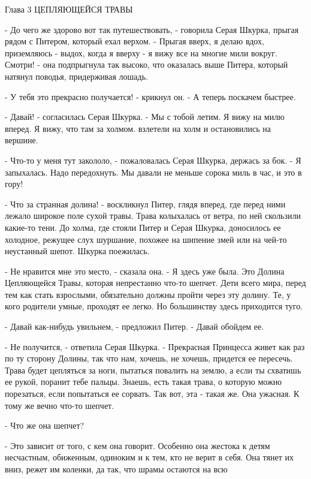 Глава 3
 ЦЕПЛЯЮЩЕЙСЯ ТРАВЫ
\par\par- До чего же здорово вот так путешествовать, - говорила Серая 
Шкурка, прыгая рядом с Питером, который ехал верхом. - Прыгая вверх, я 
делаю вдох, приземляюсь - выдох, когда я вверху - я вижу все на многие 
мили вокруг. Смотри! - она подпрыгнула так высоко, что оказалась выше 
Питера, который натянул поводья, придерживая лошадь.
\par- У тебя это прекрасно получается! - крикнул он. - А теперь 
поскачем быстрее.
\par- Давай! - согласилась Серая Шкурка. - Мы с тобой летим. Я вижу на 
милю вперед. Я вижу, что там за холмом.
 взлетели на холм и остановились на вершине.
\par- Что-то у меня тут закололо, - пожаловалась Серая Шкурка, держась 
за бок. - Я запыхалась. Надо передохнуть. Мы давали не меньше сорока 
миль в час, и это в гору!
\par- Что за странная долина! - воскликнул Питер, глядя вперед, где 
перед ними лежало широкое поле сухой травы. Трава колыхалась от ветра, 
по ней скользили какие-то тени. До холма, где стояли Питер и Серая 
Шкурка, доносилось ее холодное, режущее слух шуршание, похожее на 
шипение змей или на чей-то неустанный шепот.
 Шкурка поежилась.
\par- Не нравится мне это место, - сказала она. - Я здесь уже была. 
Это Долина Цепляющейся Травы, которая непрестанно что-то шепчет. Дети 
всего мира, перед тем как стать взрослыми, обязательно должны пройти 
через эту долину. Те, у кого родители умные, проходят ее легко. Но 
большинству здесь приходится туго.
\par- Давай как-нибудь увильнем, - предложил Питер. - Давай обойдем 
ее.
\par- Не получится, - ответила Серая Шкурка. - Прекрасная Принцесса 
живет как раз по ту сторону Долины, так что нам, хочешь, не хочешь, 
придется ее пересечь. Трава будет цепляться за ноги, пытаться повалить 
на землю, а если ты схватишь ее рукой, поранит тебе пальцы. Знаешь, 
есть такая трава, о которую можно порезаться, если попытаться ее 
сорвать. Так вот, эта - такая же. Она ужасная. К тому же вечно что-то 
шепчет.
\par- Что же она шепчет?
\par- Это зависит от того, с кем она говорит. Особенно она жестока к 
детям несчастным, обиженным, одиноким и к тем, кто не верит в себя. 
Она тянет их вниз, режет им коленки, да так, что шрамы остаются на всю 
